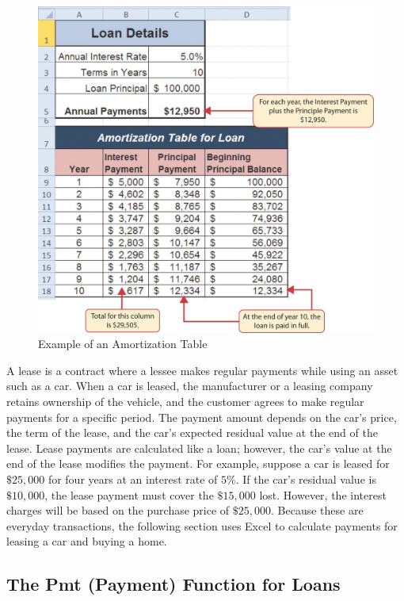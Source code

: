 \begin{figure}[H]
	\centering
	\includegraphics[width=\maxwidth{.95\linewidth}]{gfx/ch02_fig29}
	\caption{Example of an Amortization Table}
	\label{02:fig29}
\end{figure}

A lease is a contract where a lessee makes regular payments while using an asset such as a car. When a car is leased, the manufacturer or a leasing company retains ownership of the vehicle, and the customer agrees to make regular payments for a specific period. The payment amount depends on the car’s price, the term of the lease, and the car’s expected residual value at the end of the lease. Lease payments are calculated like a loan; however, the car’s value at the end of the lease modifies the payment. For example, suppose a car is leased for $ \$25,000 $ for four years at an interest rate of $ 5\% $. If the car's residual value is $ \$10,000 $, the lease payment must cover the $ \$15,000 $ lost. However, the interest charges will be based on the purchase price of $ \$25,000 $. Because these are everyday transactions, the following section uses Excel to calculate payments for leasing a car and buying a home.

\subsection{The Pmt (Payment) Function for Loans}

